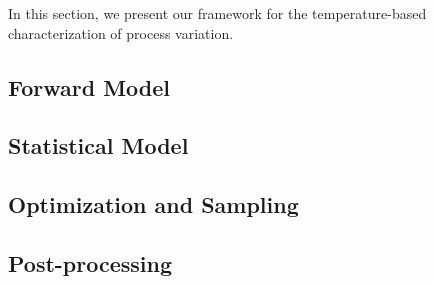 In this section, we present our framework for the temperature-based characterization of process variation.

\subsection{Forward Model}   


\subsection{Statistical Model} 


\subsection{Optimization and Sampling}


\subsection{Post-processing} 

